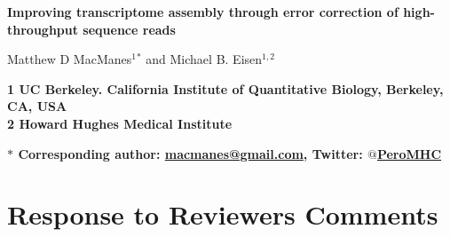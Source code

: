 \documentclass[11pt]{article}
\begin{document}
\begin{flushleft}


{\Large
\textbf{Improving transcriptome assembly through error correction of high-throughput sequence reads}
}
\\ 
\vspace{4mm}

\noindent
Matthew D MacManes$^{1}$$^\ast$ and
Michael B. Eisen$^{1,2}$ \\
\vspace{5mm}

\bf{1} \textnormal{UC Berkeley. California Institute of Quantitative Biology, Berkeley, CA, USA} \\
\bf{2} \textnormal{Howard Hughes Medical Institute} \\
\vspace{2mm}
 
\bf{$\ast$} \textnormal{Corresponding author: \href{mailto:macmanes@gmail.com}{macmanes@gmail.com}, Twitter: \href{https://twitter.com/PeroMHC}{$@$PeroMHC}}
\end{flushleft}
\vspace{4mm}



\section*{Response to Reviewers Comments}
\end{document}
